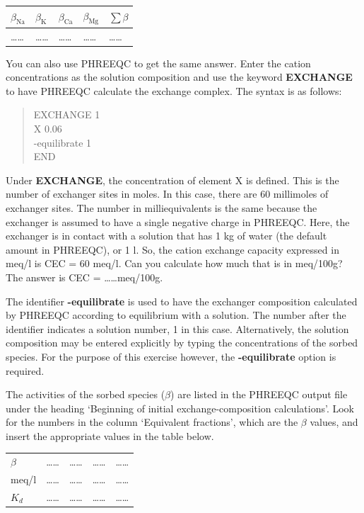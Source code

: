 \begin{table}[hb]
\centering
\footnotesize
\begin{tabular}{lllll}
\toprule
$\beta_\text{Na}$	& $\beta_\text{K}$ & $\beta_\text{Ca}$ & $\beta_\text{Mg}$ & $\sum \beta$\\
\midrule
\ldots\ldots & \ldots\ldots & \ldots\ldots & \ldots\ldots & \ldots\ldots \\
\bottomrule
\end{tabular}
\end{table}

You can also use PHREEQC to get the same answer. Enter the cation concentrations as the solution composition and use the keyword \textbf{EXCHANGE} to have PHREEQC calculate the exchange complex. The syntax is as follows:

\begin{quote}
EXCHANGE 1 \\
	X 0.06 \\
	-equilibrate 1 \\
END
\end{quote}

Under \textbf{EXCHANGE}, the concentration of element X is defined. 
This is the number of exchanger sites in moles. 
In this case, there are 60 millimoles of exchanger sites. The number in milliequivalents is the same because the exchanger is assumed to have a single negative charge in PHREEQC. Here, the exchanger is in contact with a solution that has 1 kg of water (the default amount in PHREEQC), or 1 l. So, the cation exchange capacity expressed in meq/l is CEC = 60 meq/l. Can you calculate how much that is in meq/100g? The answer is CEC = \ldots\ldots meq/100g.

The identifier \textbf{-equilibrate} is used to have the exchanger composition calculated by PHREEQC according to equilibrium with a solution. The number after the identifier indicates a solution number, 1 in this case. Alternatively, the solution composition may be entered explicitly by typing the concentrations of the sorbed species. For the purpose of this exercise however, the \textbf{-equilibrate} option is required.

The activities of the sorbed species ($\beta$) are listed in the PHREEQC output file under the heading `Beginning of initial exchange-composition calculations'. Look for the numbers in the column `Equivalent fractions', which are the $\beta$ values, and insert the appropriate values in the table below.

\begin{table}[h]
\centering
\footnotesize
\begin{tabular}{lllll}
\toprule
 & \na	& \ka & \ca & \mg \\
\midrule
$\beta$ & \ldots\ldots & \ldots\ldots & \ldots\ldots & \ldots\ldots \\
meq/l   & \ldots\ldots & \ldots\ldots & \ldots\ldots & \ldots\ldots \\
$K_d$   & \ldots\ldots & \ldots\ldots & \ldots\ldots & \ldots\ldots \\
\bottomrule
\end{tabular}
\end{table}

